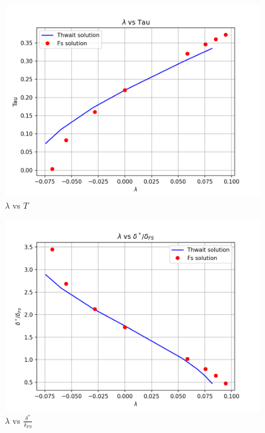 \begin{figure}
   \centering
    \includegraphics[scale=0.5]{supporting_documents/02_question_2_and_3_codeDevelopment/03_postProcessing/lambda_vs_Tau_thwait.png}
    \caption{ $\lambda$ vs $T$}
    \label{plot_a_3}
\end{figure}

\begin{figure}
   \centering
    \includegraphics[scale=0.5]{supporting_documents/02_question_2_and_3_codeDevelopment/03_postProcessing/lambda_vs_d_star_dFS_thwait.png}
    \caption{ $\lambda$ vs $\frac{\delta^*}{\delta_{FS}}$ }
    \label{plot_a_4}
\end{figure}

